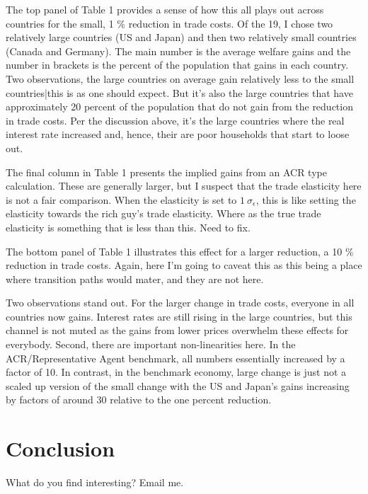 \documentclass[12pt,pdftex]{article}
\begin{document}
\begin{onehalfspacing}
The top panel of Table 1 provides a sense of how this all plays out across countries for the small, 1 \% reduction in trade costs. Of the 19, I chose two relatively large countries (US and Japan) and then two relatively small countries (Canada and Germany). The main number is the average welfare gains and the number in brackets is the percent of the population that gains in each country. Two observations, the large countries on average gain relatively less to the small countries|this is as one should expect. But it's also the large countries that have approximately 20 percent of the population that do not gain from the reduction in trade costs. Per the discussion above, it's the large countries where the real interest rate increased and, hence, their are poor households that start to loose out.

The final column in Table 1 presents the implied gains from an ACR type calculation. These are generally larger, but I suspect that the trade elasticity here is not a fair comparison. When the elasticity is set to $1 \ \sigma_{\epsilon}$, this is like setting the elasticity towards the rich guy's trade elasticity. Where as the true trade elasticity is something that is less than this. Need to fix.


The bottom panel of Table 1 illustrates this effect for a larger reduction, a 10 \% reduction in trade costs. Again, here I'm going to caveat this as this being a place where transition paths would mater, and they are not here.

Two observations stand out. For the larger change in trade costs, everyone in all countries now gains. Interest rates are still rising in the large countries, but this channel is not muted as the gains from lower prices overwhelm these effects for everybody. Second, there are important non-linearities here. In the ACR/Representative Agent benchmark, all numbers essentially increased by a factor of 10. In contrast, in the benchmark economy, large change is just not a scaled up version of the small change with the US and Japan's gains increasing by factors of around 30 relative to the one percent reduction.


\section{Conclusion}

 What do you find interesting? Email me.



\appendix


\end{onehalfspacing}
\end{document}
